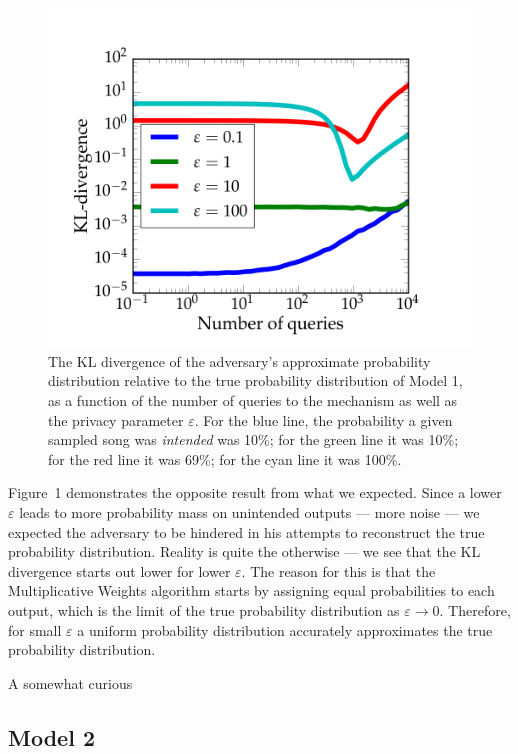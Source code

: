 \documentclass[preprint2]{aastex}
\begin{document}
\begin{figure}[H]
\vspace{-0.24cm}
\centering
\hspace*{-0.5cm}\includegraphics[width=1.2\textwidth]{model1_KL.png}
\caption{The KL divergence of the adversary's approximate probability distribution relative to the true probability distribution of Model 1, as a function of the number of queries to the mechanism as well as the privacy parameter \(\varepsilon\). For the blue line, the probability a given sampled song was \emph{intended} was 10\%; for the green line it was 10\%; for the red line it was 69\%; for the cyan line it was 100\%.}
\end{figure}

Figure~1 demonstrates the opposite result from what we expected. Since a lower \(\varepsilon\) leads to more probability mass on unintended outputs --- more noise --- we expected the adversary to be hindered in his attempts to reconstruct the true probability distribution. Reality is quite the otherwise --- we see that the KL divergence starts out lower for lower \(\varepsilon\). The reason for this is that the Multiplicative Weights algorithm starts by assigning equal probabilities to each output, which is the limit of the true probability distribution as \(\varepsilon \rightarrow 0\). Therefore, for small \(\varepsilon\) a uniform probability distribution accurately approximates the true probability distribution.

A somewhat curious 

\subsection{Model 2}
\end{document}
